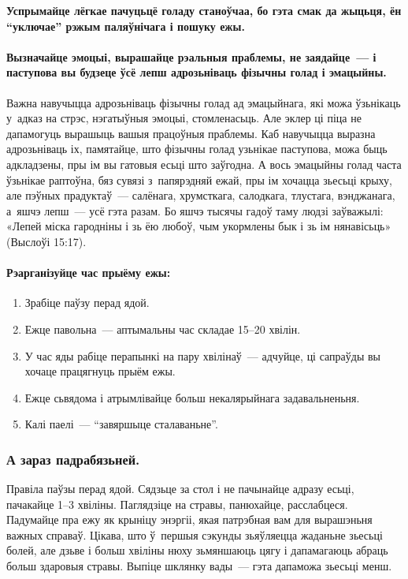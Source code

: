 \textbf{Успрымайце лёгкае пачуцьцё голаду станоўчаа, бо гэта смак да жыцьця, ён ``уключае'' рэжым паляўнічага і пошуку ежы.}

\paragraph{Вызначайце эмоцыі, вырашайце рэальныя праблемы, не заядайце~--- і паступова вы будзеце ўсё лепш адрозьніваць фізычны голад і эмацыйны.} Важна навучыцца адрозьніваць фізычны голад ад эмацыйнага, які можа ўзьнікаць у~адказ на стрэс, нэгатыўныя эмоцыі, стомленасьць. Але эклер ці піца не дапамогуць вырашыць вашыя працоўныя праблемы. Каб навучыцца выразна адрозьніваць іх, памятайце, што фізычны голад узьнікае паступова, можа быць адкладзены, пры ім вы гатовыя есьці што заўгодна. А вось эмацыйны голад часта ўзьнікае раптоўна, бяз сувязі з~папярэдняй ежай, пры ім хочацца зьесьці крыху, але пэўных прадуктаў~--- салёнага, хрумсткага, салодкага, тлустага, вэнджанага, а~яшчэ лепш~--- усё гэта разам. Бо яшчэ тысячы гадоў таму людзі заўважылі: «Лепей міска гародніны і зь ёю любоў, чым укормлены бык і зь ім нянавісьць» (Выслоўі 15:17).

\paragraph{Рэарганізуйце час прыёму ежы:}
\begin{enumerate}
  \item Зрабіце паўзу перад ядой.
  \item Ежце павольна~--- аптымальны час складае 15--20 хвілін.
  \item У час яды рабіце перапынкі на пару хвілінаў~--- адчуйце, ці сапраўды вы хочаце працягнуць прыём ежы.
  \item Ежце сьвядома і атрымлівайце больш некалярыйнага задавальненьня.
  \item Калі паелі~--- ``завяршыце сталаваньне''.
\end{enumerate}

\subsubsection{А зараз падрабязьней.}
Правіла паўзы перад ядой. Сядзьце за стол і не пачынайце адразу есьці, пачакайце 1--3 хвіліны. Паглядзіце на стравы, панюхайце, расслабцеся. Падумайце пра ежу як крыніцу энэргіі, якая патрэбная вам для вырашэньня важных справаў. Цікава, што ў~першыя сэкунды зьяўляецца жаданьне зьесьці болей, але дзьве і больш хвіліны нюху зьмяншаюць цягу і дапамагаюць абраць больш здаровыя стравы. Выпіце шклянку вады~--- гэта дапаможа зьесьці менш. 

